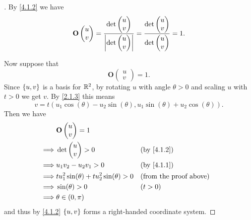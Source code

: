 \begin{proof}[]
	By \cref{4.1.2} we have
	\[
		\mathbf{O}\begin{pmatrix}
			u \\
			v
		\end{pmatrix} = \frac{\det\begin{pmatrix}
				u \\
				v
			\end{pmatrix}}{\left\lvert\det\begin{pmatrix}
					u \\
					v
				\end{pmatrix}\right\rvert} = \frac{\det\begin{pmatrix}
				u \\
				v
			\end{pmatrix}}{\det\begin{pmatrix}
				u \\
				v
			\end{pmatrix}} = 1.
	\]

	Now suppose that
	\[
		\mathbf{O}\begin{pmatrix}
			u \\
			v
		\end{pmatrix} = 1.
	\]
	Since \(\left\lbrace u, v\right\rbrace\) is a basis for \(\mathbb{R}^2\), by rotating \(u\) with angle \(\theta > 0\) and scaling \(u\) with \(t > 0\) we get \(v\).
	By \cref{2.1.3} this means
	\[
		v = t (u_1 \cos(\theta) - u_2 \sin(\theta), u_1 \sin(\theta) + u_2 \cos(\theta)).
	\]
	Then we have
	\begin{align*}
		         & \mathbf{O}\begin{pmatrix}
			                     u \\
			                     v
		                     \end{pmatrix} = 1                                                        \\
		\implies & \det\begin{pmatrix}
			               u \\
			               v
		               \end{pmatrix} > 0                             &  & \by{4.1.2}                  \\
		\implies & u_1 v_2 - u_2 v_1 > 0                           &  & \by{4.1.1}                    \\
		\implies & t u_1^2 \sin(\theta) + t u_2^2 \sin(\theta) > 0 &  & \text{(from the proof above)} \\
		\implies & \sin(\theta) > 0                                &  & (t > 0)                       \\
		\implies & \theta \in (0, \pi)
	\end{align*}
	and thus by \cref{4.1.2} \(\left\lbrace u, v\right\rbrace\) forms a right-handed coordinate system.
\end{proof}
